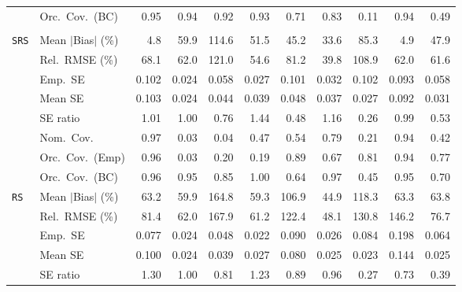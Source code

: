 \begin{landscape}
\begin{longtable}{llrrrrrrrrr}
 & Orc.\ Cov.\ (BC) & \cellcolor{rankone}0.95 & \cellcolor{ranktwo}0.94 & 0.92 & \cellcolor{rankthree}0.93 & 0.71 & 0.83 & 0.11 & \cellcolor{ranktwo}0.94 & 0.49 \\
\addlinespace[2pt]
\multicolumn{11}{l}{\textbf{Interaction}} \\
\addlinespace[2pt]
\quad \texttt{SRS} & Mean $|$Bias$|$ (\%) & \cellcolor{rankone}4.8 & 59.9 & 114.6 & 51.5 & 45.2 & \cellcolor{rankthree}33.6 & 85.3 & \cellcolor{ranktwo}4.9 & 47.9 \\
 & Rel.\ RMSE (\%) & 68.1 & 62.0 & 121.0 & \cellcolor{ranktwo}54.6 & 81.2 & \cellcolor{rankone}39.8 & 108.9 & 62.0 & \cellcolor{rankthree}61.6 \\
 & Emp.\ SE & 0.102 & 0.024 & 0.058 & 0.027 & 0.101 & 0.032 & 0.102 & 0.093 & 0.058 \\
 & Mean SE & 0.103 & 0.024 & 0.044 & 0.039 & 0.048 & 0.037 & 0.027 & 0.092 & 0.031 \\
 & SE ratio & \cellcolor{ranktwo}1.01 & \cellcolor{rankone}1.00 & 0.76 & 1.44 & 0.48 & \cellcolor{rankthree}1.16 & 0.26 & \cellcolor{ranktwo}0.99 & 0.53 \\
 & Nom.\ Cov. & \cellcolor{ranktwo}0.97 & 0.03 & 0.04 & 0.47 & 0.54 & \cellcolor{rankthree}0.79 & 0.21 & \cellcolor{rankone}0.94 & 0.42 \\
 & Orc.\ Cov.\ (Emp) & \cellcolor{rankone}0.96 & 0.03 & 0.20 & 0.19 & \cellcolor{ranktwo}0.89 & 0.67 & \cellcolor{rankthree}0.81 & \cellcolor{rankone}0.94 & 0.77 \\
 & Orc.\ Cov.\ (BC) & \cellcolor{ranktwo}0.96 & \cellcolor{rankone}0.95 & 0.85 & 1.00 & 0.64 & \cellcolor{rankthree}0.97 & 0.45 & \cellcolor{rankone}0.95 & 0.70 \\
\addlinespace[2pt]
\quad \texttt{RS} & Mean $|$Bias$|$ (\%) & 63.2 & \cellcolor{rankthree}59.9 & 164.8 & \cellcolor{ranktwo}59.3 & 106.9 & \cellcolor{rankone}44.9 & 118.3 & 63.3 & 63.8 \\
 & Rel.\ RMSE (\%) & 81.4 & \cellcolor{rankthree}62.0 & 167.9 & \cellcolor{ranktwo}61.2 & 122.4 & \cellcolor{rankone}48.1 & 130.8 & 146.2 & 76.7 \\
 & Emp.\ SE & 0.077 & 0.024 & 0.048 & 0.022 & 0.090 & 0.026 & 0.084 & 0.198 & 0.064 \\
 & Mean SE & 0.100 & 0.024 & 0.039 & 0.027 & 0.080 & 0.025 & 0.023 & 0.144 & 0.025 \\
 & SE ratio & 1.30 & \cellcolor{rankone}1.00 & 0.81 & 1.23 & \cellcolor{rankthree}0.89 & \cellcolor{ranktwo}0.96 & 0.27 & 0.73 & 0.39 \\

\end{longtable}
\end{landscape}
